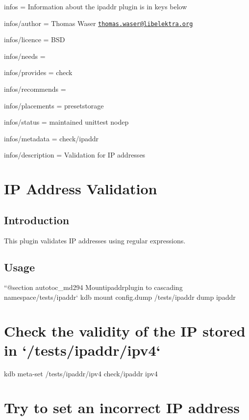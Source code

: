 
\begin{DoxyItemize}
\item infos = Information about the ipaddr plugin is in keys below
\item infos/author = Thomas Waser \href{mailto:thomas.waser@libelektra.org}{\tt thomas.\+waser@libelektra.\+org}
\item infos/licence = B\+SD
\item infos/needs =
\item infos/provides = check
\item infos/recommends =
\item infos/placements = presetstorage
\item infos/status = maintained unittest nodep
\item infos/metadata = check/ipaddr
\item infos/description = Validation for IP addresses
\end{DoxyItemize}\hypertarget{autotoc_md291_src_plugins_ipaddr_README_md}{}\section{I\+P Address Validation}\label{autotoc_md291_src_plugins_ipaddr_README_md}
\hypertarget{autotoc_md291_autotoc_md292}{}\subsection{Introduction}\label{autotoc_md291_autotoc_md292}
This plugin validates IP addresses using regular expressions.\hypertarget{autotoc_md291_autotoc_md293}{}\subsection{Usage}\label{autotoc_md291_autotoc_md293}
``{\ttfamily  @section autotoc\+\_\+md294 Mount}ipaddr{\ttfamily plugin to cascading namespace}/tests/ipaddr` kdb mount config.\+dump /tests/ipaddr dump ipaddr\hypertarget{autotoc_md291_autotoc_md295}{}\section{Check the validity of the I\+P stored in `/tests/ipaddr/ipv4`}\label{autotoc_md291_autotoc_md295}
kdb meta-\/set /tests/ipaddr/ipv4 check/ipaddr ipv4\hypertarget{autotoc_md291_autotoc_md296}{}\section{Try to set an incorrect I\+P address}\label{autotoc_md291_autotoc_md296}
